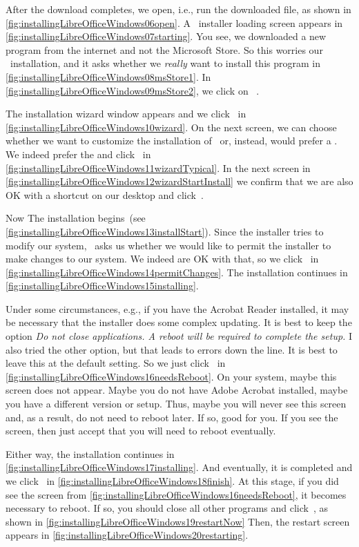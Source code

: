 After the download completes, we open, i.e., run the downloaded file, as shown in \cref{fig:installingLibreOfficeWindows06open}.
A \microsoftWindows\ installer loading screen appears in \cref{fig:installingLibreOfficeWindows07starting}.
You see, we downloaded a new program from the internet and not the Microsoft Store.
So this worries our \microsoftWindows\ installation, and it asks whether we \emph{really} want to install this program in \cref{fig:installingLibreOfficeWindows08msStore1}.
In \cref{fig:installingLibreOfficeWindows09msStore2}, we click on ~.

The installation wizard window appears and we click~ in \cref{fig:installingLibreOfficeWindows10wizard}.
On the next screen, we can choose whether we want to customize the installation of \libreoffice\ or, instead, would prefer a .
We indeed prefer the  and click~ in \cref{fig:installingLibreOfficeWindows11wizardTypical}.
In the next screen in \cref{fig:installingLibreOfficeWindows12wizardStartInstall} we confirm that we are also OK with a shortcut on our desktop and click~.

Now The installation begins~(see \cref{fig:installingLibreOfficeWindows13installStart}).
Since the installer tries to modify our system, \microsoftWindows\ asks us whether we would like to permit the installer to make changes to our system.
We indeed are OK with that, so we click~ in \cref{fig:installingLibreOfficeWindows14permitChanges}.
The installation continues in \cref{fig:installingLibreOfficeWindows15installing}.

Under some circumstances, e.g., if you have the Acrobat Reader installed, it may be necessary that the installer does some complex updating.
It is best to keep the option \emph{Do not close applications. A reboot will be required to complete the setup.}
I also tried the other option, but that leads to errors down the line.
It is best to leave this at the default setting.
So we just click~ in \cref{fig:installingLibreOfficeWindows16needsReboot}.
On your system, maybe this screen does not appear.
Maybe you do not have Adobe Acrobat installed, maybe you have a different version or setup.
Thus, maybe you will never see this screen and, as a result, do not need to reboot later.
If so, good for you.
If you see the screen, then just accept that you will need to reboot eventually.

Either way, the installation continues in \cref{fig:installingLibreOfficeWindows17installing}.
And eventually, it is completed and we click~ in \cref{fig:installingLibreOfficeWindows18finish}.
At this stage, if you did see the screen from \cref{fig:installingLibreOfficeWindows16needsReboot}, it becomes necessary to reboot.
If so, you should close all other programs and click~, as shown in \cref{fig:installingLibreOfficeWindows19restartNow}
Then, the restart screen appears in \cref{fig:installingLibreOfficeWindows20restarting}.

